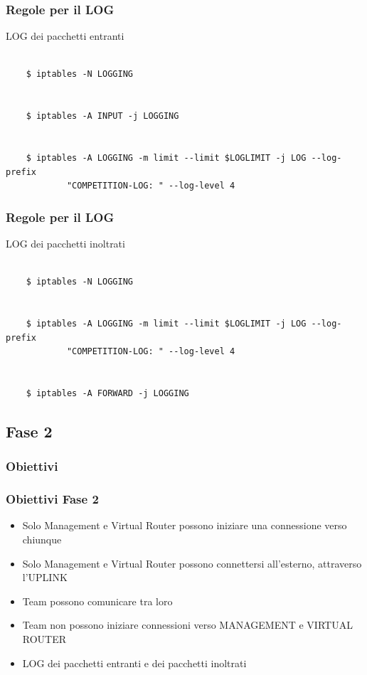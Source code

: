 \documentclass{beamer}
\begin{document}
\begin{frame}[fragile]
    \frametitle{Regole per il LOG}
    LOG dei pacchetti entranti
    \\~\\
    \begin{lstlisting}
    $ iptables -N LOGGING
    
    
    $ iptables -A INPUT -j LOGGING
    
    
    $ iptables -A LOGGING -m limit --limit $LOGLIMIT -j LOG --log-prefix 
            "COMPETITION-LOG: " --log-level 4

    \end{lstlisting}

\end{frame}


\begin{frame}[fragile]
    \frametitle{Regole per il LOG}
    LOG dei pacchetti inoltrati
    \\~\\
    \begin{lstlisting}
    $ iptables -N LOGGING


    $ iptables -A LOGGING -m limit --limit $LOGLIMIT -j LOG --log-prefix 
            "COMPETITION-LOG: " --log-level 4
    
    
    $ iptables -A FORWARD -j LOGGING
    \end{lstlisting}

\end{frame}

\subsection{Fase 2}
\subsubsection{Obiettivi}
\begin{frame}
    \frametitle{Obiettivi Fase 2}
    \begin{itemize}
        \item<1-> Solo Management e Virtual Router possono iniziare una connessione verso chiunque
        \item<2-> Solo Management e Virtual Router possono connettersi all'esterno, attraverso l'UPLINK
        \item<3-> Team possono comunicare tra loro
        \item<4-> Team non possono iniziare connessioni verso MANAGEMENT e VIRTUAL ROUTER
        \item<4-> LOG dei pacchetti entranti e dei pacchetti inoltrati
    \end{itemize}
    

\end{frame}
\end{document}
